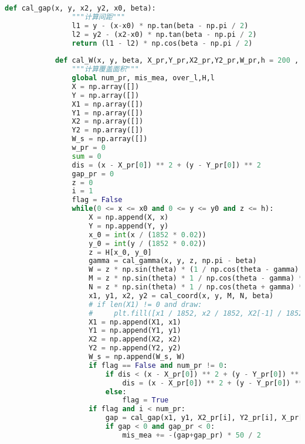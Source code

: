 \documentclass[withoutpreface,bwprint]{cumcmthesis} %
\begin{document}
\begin{appendices}
\begin{lstlisting}[language=python]
            def cal_gap(x, y, x2, y2, x0, beta):
                """计算间距"""
                l1 = y - (x-x0) * np.tan(beta - np.pi / 2)
                l2 = y2 - (x2-x0) * np.tan(beta - np.pi / 2)
                return (l1 - l2) * np.cos(beta - np.pi / 2)
            
            def cal_W(x, y, beta, X_pr,Y_pr,X2_pr,Y2_pr,W_pr,h = 200 , theta = np.pi / 3, x0 = 5 * 1852, y0 = 4 * 1852,draw = False, color = 'red'):
                """计算覆盖面积"""
                global num_pr, mis_mea, over_l,H,l
                X = np.array([])
                Y = np.array([])
                X1 = np.array([])
                Y1 = np.array([])
                X2 = np.array([])
                Y2 = np.array([])
                W_s = np.array([])
                w_pr = 0
                sum = 0
                dis = (x - X_pr[0]) ** 2 + (y - Y_pr[0]) ** 2
                gap_pr = 0
                z = 0
                i = 1
                flag = False
                while(0 <= x <= x0 and 0 <= y <= y0 and z <= h):
                    X = np.append(X, x)
                    Y = np.append(Y, y)
                    x_0 = int(x / (1852 * 0.02))
                    y_0 = int(y / (1852 * 0.02))
                    z = H[x_0, y_0]
                    gamma = cal_gamma(x, y, z, np.pi - beta)
                    W = z * np.sin(theta) * (1 / np.cos(theta - gamma) + 1 / np.cos(theta + gamma)) * np.cos(gamma)
                    M = z * np.sin(theta) * 1 / np.cos(theta - gamma) * np.cos(gamma)   
                    N = z * np.sin(theta) * 1 / np.cos(theta + gamma) * np.cos(gamma)
                    x1, y1, x2, y2 = cal_coord(x, y, M, N, beta)
                    # if len(X1) != 0 and draw:
                    #     plt.fill([x1 / 1852, x2 / 1852, X2[-1] / 1852, X1[-1] / 1852], [y1 / 1852, y2 / 1852, Y2[-1] / 1852, Y1[-1] / 1852], color = 'lightblue')
                    X1 = np.append(X1, x1)
                    Y1 = np.append(Y1, y1)
                    X2 = np.append(X2, x2)
                    Y2 = np.append(Y2, y2)
                    W_s = np.append(W_s, W)
                    if flag == False and num_pr != 0:
                        if dis < (x - X_pr[0]) ** 2 + (y - Y_pr[0]) ** 2:
                            dis = (x - X_pr[0]) ** 2 + (y - Y_pr[0]) ** 2
                        else:
                            flag = True
                    if flag and i < num_pr:
                        gap = cal_gap(x1, y1, X2_pr[i], Y2_pr[i], X_pr[i], beta)
                        if gap < 0 and gap_pr < 0:
                            mis_mea += -(gap+gap_pr) * 50 / 2

\end{lstlisting}
\end{appendices}
\end{document}
